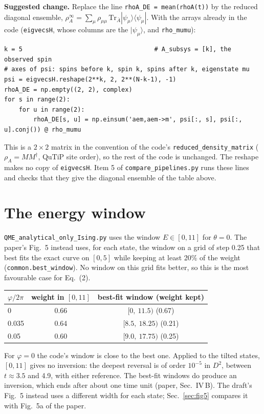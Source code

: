 \documentclass[11pt]{article}
\newcommand{\code}[1]{\texttt{#1}}
\begin{document}
\textbf{Suggested change.} Replace the line \code{rhoA\_DE = mean(rhoA(t))} by the reduced diagonal ensemble, $\rho_A^\infty=\sum_\mu\rho_{\mu\mu}\,\mathrm{Tr}_{\bar A}|\psi_\mu\rangle\langle\psi_\mu|$. With the arrays already in the code (\code{eigvecsH}, whose columns are the $|\psi_\mu\rangle$, and \code{rho\_mumu}):
\begin{Verbatim}[fontsize=\small]
k = 5                                    # A_subsys = [k], the observed spin
# axes of psi: spins before k, spin k, spins after k, eigenstate mu
psi = eigvecsH.reshape(2**k, 2, 2**(N-k-1), -1)
rhoA_DE = np.empty((2, 2), complex)
for s in range(2):
    for u in range(2):
        rhoA_DE[s, u] = np.einsum('aem,aem->m', psi[:, s], psi[:, u].conj()) @ rho_mumu
\end{Verbatim}
This is a $2\times2$ matrix in the convention of the code's \code{reduced\_density\_matrix} ($\rho_A=MM^\dagger$, QuTiP site order), so the rest of the code is unchanged. The reshape makes no copy of \code{eigvecsH}. Item 5 of \code{compare\_pipelines.py} runs these lines and checks that they give the diagonal ensemble of the table above.

\section{The energy window}\label{sec:window}
\code{QME\_analytical\_only\_Ising.py} uses the window $E\in[0,11]$ for $\theta=0$. The paper's Fig.~5 instead uses, for each state, the window on a grid of step 0.25 that best fits the exact curve on $[0,5]$ while keeping at least 20\% of the weight (\code{common.best\_window}). No window on this grid fits better, so this is the most favourable case for Eq.~(2).

\begin{center}\small
\begin{tabular}{lcc}\toprule
$\varphi/2\pi$ & weight in $[0,11]$ & best-fit window (weight kept)\\\midrule
0 & 0.66 & $[0,\ 11.5)$ (0.67)\\
0.035 & 0.64 & $[8.5,\ 18.25)$ (0.21)\\
0.05 & 0.60 & $[9.0,\ 17.75)$ (0.25)\\\bottomrule
\end{tabular}
\end{center}

For $\varphi=0$ the code's window is close to the best one. Applied to the tilted states, $[0,11]$ gives no inversion: the deepest reversal is of order $10^{-5}$ in $D^2$, between $t\approx3.5$ and 4.9, with either reference. The best-fit windows do produce an inversion, which ends after about one time unit (paper, Sec.~IV\,B). The draft's Fig.~5 instead uses a different width for each state; Sec.~\ref{sec:fig5} compares it with Fig.~5a of the paper.
\end{document}
